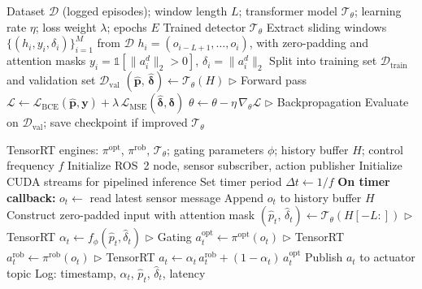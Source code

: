 \documentclass[conference]{IEEEtran}
\newcommand{\cL}{\mathcal{L}}
\newcommand{\cD}{\mathcal{D}}
\newcommand{\cT}{\mathcal{T}}
\newcommand{\piopt}{\pi^{\text{opt}}}
\newcommand{\pirob}{\pi^{\text{rob}}}
\begin{document}
\begin{algorithm}[t]
\caption{Transformer Disturbance Detector Training}
\label{alg:transformer_training}
\begin{algorithmic}[1]
\renewcommand{\algorithmicrequire}{\textbf{Input:}}
\renewcommand{\algorithmicensure}{\textbf{Output:}}
\REQUIRE Dataset $\cD$ (logged episodes); window length $L$;
  transformer model $\cT_\theta$; learning rate $\eta$;
  loss weight $\lambda$; epochs $E$
\ENSURE Trained detector $\cT_\theta$
\STATE Extract sliding windows $\{(h_i, y_i, \delta_i)\}_{i=1}^{M}$
  from $\cD$
\STATE \quad $h_i = (o_{i-L+1}, \ldots, o_i)$, with zero-padding and
  attention masks
\STATE \quad $y_i = \mathbb{1}[\|a_i^d\|_2 > 0]$, \quad
  $\delta_i = \|a_i^d\|_2$
\STATE Split into training set $\cD_{\text{train}}$ and validation set
  $\cD_{\text{val}}$
  \FOR{each mini-batch $(H, \boldsymbol{y}, \boldsymbol{\delta})
    \subset \cD_{\text{train}}$}
    \STATE $(\hat{\boldsymbol{p}},\, \hat{\boldsymbol{\delta}})
      \leftarrow \cT_\theta(H)$ \hfill $\triangleright$ Forward pass
    \STATE $\cL \leftarrow \cL_{\text{BCE}}(\hat{\boldsymbol{p}},
      \boldsymbol{y}) + \lambda\,\cL_{\text{MSE}}(\hat{\boldsymbol{\delta}},
      \boldsymbol{\delta})$
    \STATE $\theta \leftarrow \theta - \eta\,\nabla_\theta \cL$
      \hfill $\triangleright$ Backpropagation
  \ENDFOR
  \STATE Evaluate on $\cD_{\text{val}}$; save checkpoint if improved
\ENDFOR
\RETURN $\cT_\theta$
\end{algorithmic}
\end{algorithm}

\begin{algorithm}[t]
\caption{Deployment Inference Loop (ROS~2 Node)}
\label{alg:deployment}
\begin{algorithmic}[1]
\renewcommand{\algorithmicrequire}{\textbf{Input:}}
\REQUIRE TensorRT engines: $\piopt$, $\pirob$, $\cT_\theta$;
  gating parameters $\phi$; history buffer $H$; control frequency $f$
\STATE Initialize ROS~2 node, sensor subscriber, action publisher
\STATE Initialize CUDA streams for pipelined inference
\STATE Set timer period $\Delta t \leftarrow 1/f$
\STATE \textbf{On timer callback:}
\STATE \quad $o_t \leftarrow$ read latest sensor message
\STATE \quad Append $o_t$ to history buffer $H$
  \STATE \quad Construct zero-padded input with attention mask
\ENDIF
\STATE \quad $(\hat{p}_t,\, \hat{\delta}_t) \leftarrow
  \cT_\theta(H[-L:])$ \hfill $\triangleright$ TensorRT
\STATE \quad $\alpha_t \leftarrow f_\phi(\hat{p}_t, \hat{\delta}_t)$
  \hfill $\triangleright$ Gating
\STATE \quad $a^{\text{opt}}_t \leftarrow \piopt(o_t)$
  \hfill $\triangleright$ TensorRT
\STATE \quad $a^{\text{rob}}_t \leftarrow \pirob(o_t)$
  \hfill $\triangleright$ TensorRT
\STATE \quad $a_t \leftarrow \alpha_t\,a^{\text{rob}}_t +
  (1 - \alpha_t)\,a^{\text{opt}}_t$
\STATE \quad Publish $a_t$ to actuator topic
\STATE \quad Log: timestamp, $\alpha_t$, $\hat{p}_t$, $\hat{\delta}_t$,
  latency
\end{algorithmic}
\end{algorithm}
\end{document}
